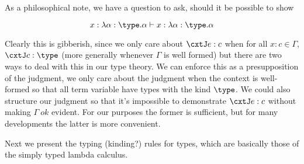 \documentclass{amsart}
\begin{document}

As a philosophical note, we have a question to ask, should it be
possible to show

\[
  x : \lambda \alpha : \type. \alpha \vdash x : \lambda \alpha : \type. \alpha
\]

Clearly this is gibberish, since we only care about
$\cxtJ e : c$ when for all $x : c \in \Gamma$,
$\cxtJ c : \type$ (more generally whenever $\Gamma$ is well
formed) but there are two ways to deal with this in our type
theory. We can enforce this as a presupposition of the judgment, we
only care about the judgment when the context is well-formed so that
all term variable have types with the kind $\type$. We could also
structure our judgment so that it's impossible to demonstrate
$\cxtJ e : c$ without making $\Gamma\ ok$ evident. For our purposes the former is sufficient, but for many developments the
latter is more convenient.

Next we present the typing (kinding?) rules for types, which are basically those of the simply typed lambda calculus.

\end{document}
